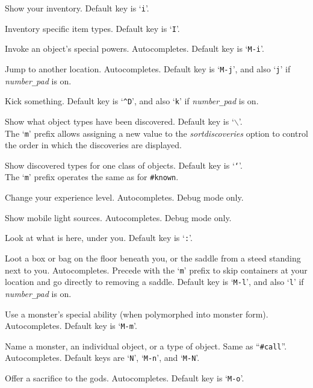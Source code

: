 \item[\tb{\#inventory}]
Show your inventory. Default key is `{\tt i}'.
\item[\tb{\#inventtype}]
Inventory specific item types. Default key is `{\tt I}'.
\item[\tb{\#invoke}]
Invoke an object's special powers. Autocompletes. Default key is `{\tt M-i}'.
\item[\tb{\#jump}]
Jump to another location. Autocompletes.
Default key is `{\tt M-j}',
and also `{\tt j}' if {\it number\verb+_+pad\/} is on.
\item[\tb{\#kick}]
Kick something.
Default key is `{\tt \^{}D}',
and also `{\tt k}' if {\it number\verb+_+pad\/} is on.
\item[\tb{\#known}]
Show what object types have been discovered.
Default key is `{\tt $\backslash$}'.
\\
The `{\tt m}' prefix allows assigning a new value to the
{\it sortdiscoveries\/}
option to control the order in which the discoveries are displayed.
\item[\tb{\#knownclass}]
Show discovered types for one class of objects.
Default key is `{\tt `}'.
\\
The `{\tt m}' prefix operates the same as for {\tt \#known}.
\item[\tb{\#levelchange}]
Change your experience level.
Autocompletes.
Debug mode only.
\item[\tb{\#lightsources}]
Show mobile light sources.
Autocompletes.
Debug mode only.
\item[\tb{\#look}]
Look at what is here, under you. Default key is `{\tt :}'.
\item[\tb{\#loot}]
Loot a box or bag on the floor beneath you, or the saddle
from a steed standing next to you. Autocompletes.
Precede with the `{\tt m}' prefix to skip containers at your location
and go directly to removing a saddle.
Default key is `{\tt M-l}',
and also `{\tt l}' if {\it number\verb+_+pad\/} is on.
\item[\tb{\#monster}]
Use a monster's special ability (when polymorphed into monster form).
Autocompletes. Default key is `{\tt M-m}'.
\item[\tb{\#name}]
Name a monster, an individual object, or a type of object.
Same as ``{\tt \#call}''.
Autocompletes.
Default keys are `{\tt N}', `{\tt M-n}', and `{\tt M-N}'.
\item[\tb{\#offer}]
Offer a sacrifice to the gods. Autocompletes. Default key is `{\tt M-o}'.\\
